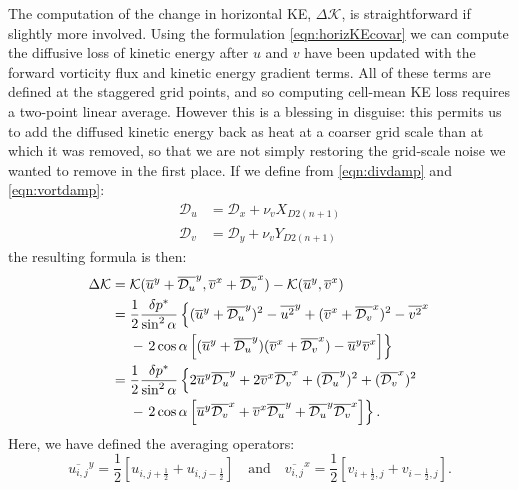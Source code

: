 \documentclass[10pt,letterpaper,margin=1in]{memoir}
\newcommand{\half}{\frac{1}{2}}
\begin{document}
The computation of the change in horizontal KE, $\Delta \mathcal{K}$, is straightforward if slightly more involved. Using the formulation \eqref{eqn:horizKEcovar} we can compute the diffusive loss of kinetic energy after $u$ and $v$ have been updated with the forward vorticity flux and kinetic energy gradient terms. All of these terms are defined at the staggered grid points, and so computing cell-mean KE loss requires a two-point linear average. However this is a blessing in disguise: this permits us to add the diffused kinetic energy back as heat at a coarser grid scale than at which it was removed, so that we are not simply restoring the grid-scale noise we wanted to remove in the first place. If we define from \eqref{eqn:divdamp} and \eqref{eqn:vortdamp}:
\begin{equation}
\begin{split}
  \mathcal{D}_u &= \mathcal{D}_x + \nu_vX_{D2(n+1)} \\
  \mathcal{D}_v &= \mathcal{D}_y + \nu_vY_{D2(n+1)}
\end{split}
\end{equation}
the resulting formula is then:
\begin{align}
\notag \Delta \mathcal{K} =\; & \mathcal{K}(\overline{u}^y+\overline{\mathcal{D}_u}^y, \overline{v}^x+\overline{\mathcal{D}_v}^x) -  \mathcal{K}(\overline{u}^y,\overline{v}^x) \\
=\; & \frac{1}{2}\frac{\delta p^*}{\sin^2\alpha}\left \lbrace (\overline{u}^y+\overline{\mathcal{D}_u}^y)^2 - \overline{u^2}^y + (\overline{v}^x+\overline{\mathcal{D}_v}^x)^2 - \overline{v^2}^x  \right. \\
\notag & - \left. 2\cos\alpha \left[(\overline{u}^y+\overline{\mathcal{D}_u}^y)(\overline{v}^x+\overline{\mathcal{D}_v}^x) - \overline{u}^y \overline{v}^x \right ] \right \rbrace \\
\notag =\; & \frac{1}{2}\frac{\delta p^*}{\sin^2\alpha}\left \lbrace 2\overline{u}^y \overline{\mathcal{D}_u}^y + 2\overline{v}^x \overline{\mathcal{D}_v}^x + (\overline{\mathcal{D}_u}^y)^2 + (\overline{\mathcal{D}_v}^x)^2 \right. \\
\notag &- \left. 2\cos\alpha \left[ \overline{u}^y \overline{\mathcal{D}_v}^x + \overline{v}^x \overline{\mathcal{D}_u}^y + \overline{\mathcal{D}_u}^y \overline{\mathcal{D}_v}^x\right ] \right \rbrace.
\end{align}
Here, we have defined the averaging operators:
\begin{equation} 
\overline{u_{i,j}}^y = \frac{1}{2} \left [ u_{i,j+\half} + u_{i,j-\half} \right] \quad \text{and} \quad \overline{v_{i,j}}^x = \frac{1}{2} \left [ v_{i+\half,j} + v_{i-\half,j} \right].
\end{equation}
\end{document}
